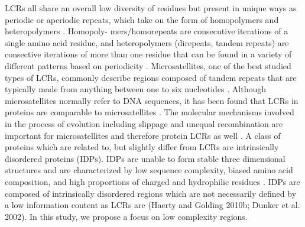 \documentclass{article}
\begin{document}
LCRs all share an overall low diversity of residues but present in unique ways as periodic or aperiodic repeats, which
take on the form of homopolymers and heteropolymers \citep{wootton1993statistics, battistuzzi2016profiles}. Homopoly-
mers/homorepeats are consecutive iterations of a single amino acid residue, and heteropolymers (direpeats, tandem repeats)
are consective iterations of more than one residue that can be found in a variety of different patterns based on periodicity
\citep{battistuzzi2016profiles, mier2020disentangling}. Microsatellites, one of the best studied types of LCRs, commonly describe regions composed of tandem repeats that are typically made from anything between one to six nucleotides \citep{ellegren2004microsatellites}. Although microsatellites normally refer to DNA sequences, it has been found that LCRs in proteins are comparable to microsatellites \citep{depristo2006abundance}. The molecular mechanisms involved in the process of evolution including slippage and unequal recombination are important for microsatellites and therefore protein LCRs as well \citep{depristo2006abundance}. A class of proteins which are related to, but slightly differ from LCRs are intrinsically disordered proteins (IDPs). IDPs are unable to form stable three dimensional structures and are characterized by low sequence complexity, biased amino acid composition, and high proportions of charged and hydrophilic residues \citep{wright2015intrinsically}. IDPs are composed of intrinsically disordered regions which are not necessarily defined by a low information content as LCRs are \citep{haerty2010low, dunker2002intrinsic} (Haerty and Golding 2010b; Dunker et al. 2002). In this study, we propose a focus on low complexity regions.
\end{document}
